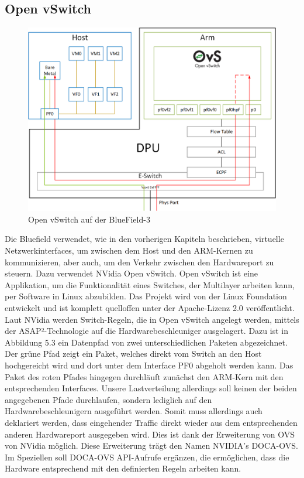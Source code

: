 \subsection{Open vSwitch}
\begin{figure}
    \centering
    \includegraphics[width=0.85\linewidth]{images/kernel_representors_model.png}
    \caption{Open vSwitch auf der BlueField-3}
    \label{fig:enter-label}
\end{figure}
Die Bluefield verwendet, wie in den vorherigen Kapiteln beschrieben, virtuelle Netzwerkinterfaces, um zwischen dem Host und den ARM-Kernen zu kommunizieren, aber auch, um den Verkehr zwischen den Hardwareport zu steuern. Dazu verwendet NVidia Open vSwitch. Open vSwitch ist eine Applikation, um die Funktionalität eines Switches, der Multilayer arbeiten kann, per Software in Linux abzubilden. Das Projekt wird von der Linux Foundation entwickelt und ist komplett quelloffen unter der Apache-Lizenz 2.0 veröffentlicht. Laut NVidia werden Switch-Regeln, die in Open vSwitch angelegt werden, mittels der ASAP²-Technologie auf die Hardwarebeschleuniger ausgelagert. Dazu ist in Abbildung 5.3 ein Datenpfad von zwei unterschiedlichen Paketen abgezeichnet. Der grüne Pfad zeigt ein Paket, welches direkt vom Switch an den Host hochgereicht wird und dort unter dem Interface PF0 abgeholt werden kann. Das Paket des roten Pfades hingegen durchläuft zunächst den ARM-Kern mit den entsprechenden Interfaces. Unsere Lastverteilung allerdings soll keinen der beiden angegebenen Pfade durchlaufen, sondern lediglich auf den Hardwarebeschleunigern ausgeführt werden. Somit muss allerdings auch deklariert werden, dass eingehender Traffic direkt wieder aus dem entsprechenden anderen Hardwareport ausgegeben wird. Dies ist dank der Erweiterung von OVS von NVidia möglich. Diese Erweiterung trägt den Namen NVIDIA's DOCA-OVS. Im Speziellen soll DOCA-OVS API-Aufrufe ergänzen, die ermöglichen, dass die Hardware entsprechend mit den definierten Regeln arbeiten kann.
